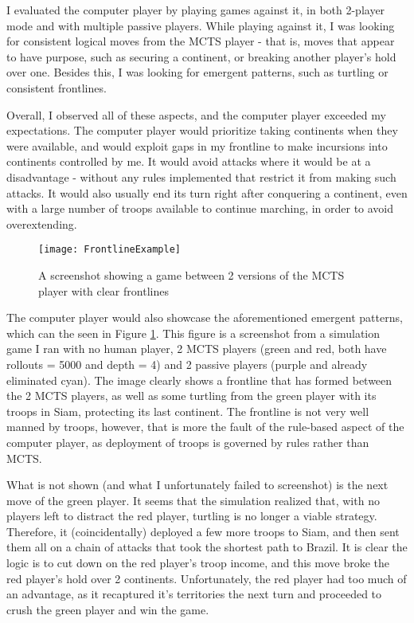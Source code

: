 I evaluated the computer player by playing games against it, in both 2-player mode and with multiple passive players. While playing against it, I was looking for consistent logical moves from the MCTS player - that is, moves that appear to have purpose, such as securing a continent, or breaking another player's hold over one. Besides this, I was looking for emergent patterns, such as turtling or consistent frontlines. 

Overall, I observed all of these aspects, and the computer player exceeded my expectations. The computer player would prioritize taking continents when they were available, and would exploit gaps in my frontline to make incursions into continents controlled by me. It would avoid attacks where it would be at a disadvantage - without any rules implemented that restrict it from making such attacks. It would also usually end its turn right after conquering a continent, even with a large number of troops available to continue marching, in order to avoid overextending.

\begin{figure}[H]
\texttt{[image: FrontlineExample]}
\caption{A screenshot showing a game between 2 versions of the MCTS player with clear frontlines}
\label{fig:FrontlineExample}
\end{figure}

The computer player would also showcase the aforementioned emergent patterns, which can the seen in Figure \ref{fig:FrontlineExample}. This figure is a screenshot from a simulation game I ran with no human player, 2 MCTS players (green and red, both have rollouts = 5000 and depth = 4) and 2 passive players (purple and already eliminated cyan). The image clearly shows a frontline that has formed between the 2 MCTS players, as well as some turtling from the green player with its troops in Siam, protecting its last continent. The frontline is not very well manned by troops, however, that is more the fault of the rule-based aspect of the computer player, as deployment of troops is governed by rules rather than MCTS.

What is not shown (and what I unfortunately failed to screenshot) is the next move of the green player. It seems that the simulation realized that, with no players left to distract the red player, turtling is no longer a viable strategy. Therefore, it (coincidentally) deployed a few more troops to Siam, and then sent them all on a chain of attacks that took the shortest path to Brazil. It is clear the logic is to cut down on the red player's troop income, and this move broke the red player's hold over 2 continents. Unfortunately, the red player had too much of an advantage, as it recaptured it's territories the next turn and proceeded to crush the green player and win the game.

